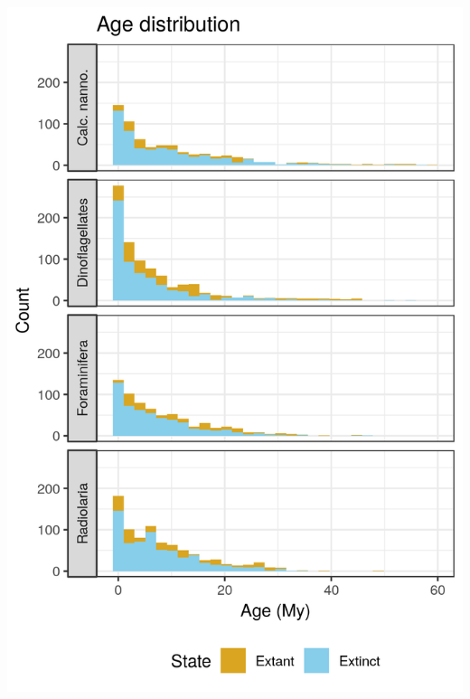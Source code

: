\documentclass{beamer}
\begin{document}
\begin{frame}
\begin{columns}
\begin{column}{0.5\textwidth}
      \includegraphics[width=\textwidth,height=\textheight,keepaspectratio=true]{../results/figure/age_label}
    \end{column}
  \end{columns}

\end{frame}
\end{document}
